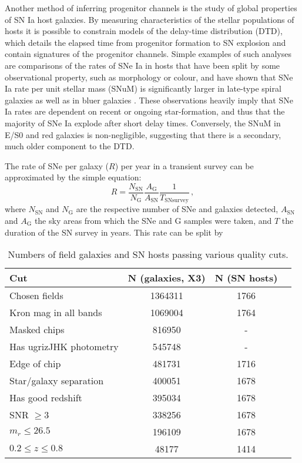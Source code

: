 \documentclass[fleqn,usenatbib]{mnras}
\begin{document}
Another method of inferring progenitor channels is the study of global properties of SN Ia host galaxies. By measuring characteristics of the stellar populations of hosts it is possible to constrain models of the delay-time distribution (DTD), which details the elapsed time from progenitor formation to SN explosion and contain signatures of the progenitor channels. Simple examples of such analyses are comparisons of the rates of SNe Ia in hosts that have been split by some observational property, such as morphology or colour, and have shown that SNe Ia rate per unit stellar mass (SNuM) is significantly larger in late-type spiral galaxies as well as in bluer galaxies \citep[e.g.][]{Mannucci2005}. These observations heavily imply that SNe Ia rates are dependent on recent or ongoing star-formation, and thus that the majority of SNe Ia explode after short delay times. Conversely, the SNuM in E/S0 and red galaxies is non-negligible, suggesting that there is a secondary, much older component to the DTD.

The rate of SNe per galaxy ($R$) per year in a transient survey can be approximated by the simple equation:
\begin{equation}
    R = \frac{N_{\mathrm{SN}}}{N_{\mathrm{G}}} \frac{A_{\mathrm{G}}}{A_{\mathrm{SN}}} \frac{1}{T_{\mathrm{SN  survey}}}\,,
\label{eq:rate1}
\end{equation}
where $N_{\mathrm{SN}}$ and $N_{\mathrm{G}}$ are the respective number of SNe and galaxies detected, $A_{\mathrm{SN}}$ and $A_{\mathrm{G}}$ the sky areas from which the SNe and G samples were taken, and $T$ the duration of the SN survey in years. This rate can be split by 
\begin{table}
	\centering
	\caption{Numbers of field galaxies and SN hosts passing various quality cuts.}
	\label{tab:field_vuts}
	\begin{tabular}{lccr} %
		\hline
		Cut & N (galaxies, X3)  & N (SN hosts)\\
		\hline
		Chosen fields & 1364311  & 1766\\
	    Kron mag in all bands & 1069004  & 1764 \\
	    Masked chips & 816950  & - \\
	    Has ugrizJHK photometry & 545748  & -\\
	    Edge of chip & 481731 & 1716 \\
	    Star/galaxy separation & 400051 &  1678\\
	    Has good redshift & 395034 & 1678 \\
	    SNR $\geq 3$& 338256  & 1678 \\
	    $m_r \leq 26.5$ & 196109 &  1678 \\
	    $0.2 \leq z \leq 0.8$ & 48177 & 1414\\ 
	    
		\hline
	\end{tabular}
\end{table}
\end{document}
